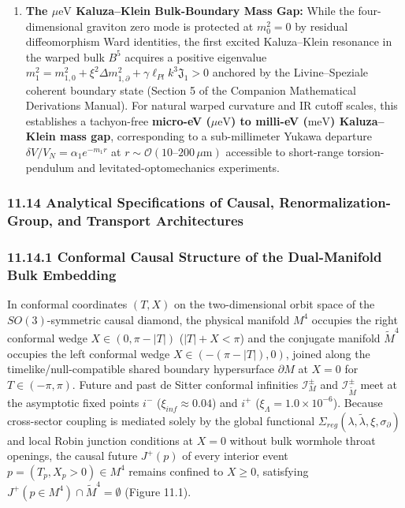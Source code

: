 \documentclass[aps,prd,onecolumn,superscriptaddress,nofootinbib,longbibliography,10pt]{revtex4-2}
\begin{document}
\begin{enumerate}
    
\item \textbf{The \(\mu\text{eV}\) Kaluza–Klein Bulk-Boundary Mass Gap:} While the four-dimensional graviton zero mode is protected at \(m_0^2 = 0\) by residual diffeomorphism Ward identities, the first excited Kaluza–Klein resonance in the warped bulk \(B^5\) acquires a positive eigenvalue \(m_1^2 = m_{1,0}^2 + \xi^2 \Delta m_{1,\partial}^2 + \gamma\ell_{Pl} k^3 \mathfrak{J}_1 > 0\) anchored by the Livine–Speziale coherent boundary state (Section 5 of the Companion Mathematical Derivations Manual). For natural warped curvature and IR cutoff scales, this establishes a tachyon-free \textbf{micro-eV (\(\mu\text{eV}\)) to milli-eV (\(\text{meV}\)) Kaluza–Klein mass gap}, corresponding to a sub-millimeter Yukawa departure \(\delta V/V_N = \alpha_1 e^{-m_1 r}\) at \(r \sim \mathcal{O}(10\text{--}200\,\mu\text{m})\) accessible to short-range torsion-pendulum and levitated-optomechanics experiments.
  
\end{enumerate}

  
  
\subsubsection*{11.14 Analytical Specifications of Causal, Renormalization-Group, and Transport Architectures}

  
\subsubsection*{11.14.1 Conformal Causal Structure of the Dual-Manifold Bulk Embedding}

  In conformal coordinates \((T,X)\) on the two-dimensional orbit space of the \(SO(3)\)-symmetric causal diamond, the physical manifold \(M^4\) occupies the right conformal wedge \(X \in (0, \pi - |T|)\) (\(|T| + X < \pi\)) and the conjugate manifold \(\tilde{M}^4\) occupies the left conformal wedge \(X \in (-(\pi - |T|), 0)\), joined along the timelike/null-compatible shared boundary hypersurface \(\partial M\) at \(X = 0\) for \(T \in (-\pi, \pi)\). Future and past de Sitter conformal infinities \(\mathcal{I}_M^\pm\) and \(\mathcal{I}_{\tilde{M}}^\pm\) meet at the asymptotic fixed points \(i^-\) (\(\xi_{inf} \approx 0.04\)) and \(i^+\) (\(\xi_\Lambda = 1.0 \times 10^{-6}\)). Because cross-sector coupling is mediated solely by the global functional \(\Sigma_{reg}(\lambda,\tilde{\lambda},\xi,\sigma_\partial)\) and local Robin junction conditions at \(X = 0\) without bulk wormhole throat openings, the causal future \(J^+(p)\) of every interior event \(p = (T_p, X_p > 0) \in M^4\) remains confined to \(X \ge 0\), satisfying \(J^+(p \in M^4) \cap \tilde{M}^4 = \emptyset\) (Figure 11.1).
\end{document}
